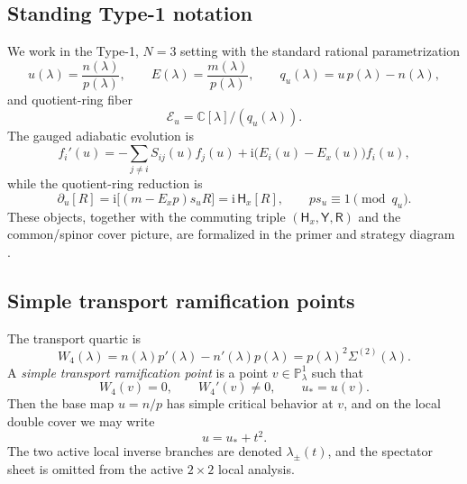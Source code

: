 \documentclass[11pt]{article}
\numberwithin{equation}{section}
\theoremstyle{definition}
\newcommand{\C}{\mathbb C}
\newcommand{\PP}{\mathbb P}
\newcommand{\ii}{\mathrm i}
\newcommand{\E}{\mathcal E}
\newcommand{\Hx}{\mathsf H_x}
\newcommand{\Yop}{\mathsf Y}
\newcommand{\Rop}{\mathsf R}
\begin{document}
\subsection{Standing Type-1 notation}

We work in the Type-1, $N=3$ setting with the standard rational parametrization
\begin{equation}
\label{eq:uE}
 u(\lambda)=\frac{n(\lambda)}{p(\lambda)},
 \qquad
 E(\lambda)=\frac{m(\lambda)}{p(\lambda)},
 \qquad
 q_u(\lambda)=u\,p(\lambda)-n(\lambda),
\end{equation}
and quotient-ring fiber
\begin{equation}
\label{eq:quotient-ring}
 \E_u=\C[\lambda]/(q_u(\lambda)).
\end{equation}
The gauged adiabatic evolution is
\begin{equation}
\label{eq:adiabatic-gauged}
 f_i'(u)=-\sum_{j\neq i}S_{ij}(u)f_j(u)+\ii\bigl(E_i(u)-E_x(u)\bigr)f_i(u),
\end{equation}
while the quotient-ring reduction is
\begin{equation}
\label{eq:reduced-ode}
 \partial_u[R]=\ii\bigl[(m-E_xp)s_u R\bigr]=\ii\,\Hx[R],
 \qquad
 p s_u\equiv 1\pmod{q_u}.
\end{equation}
These objects, together with the commuting triple $(\Hx,\Yop,\Rop)$ and the common/spinor cover picture, are formalized in the primer and strategy diagram \cite{Primer,Strategy,LZSummary}.

\subsection{Simple transport ramification points}

The transport quartic is
\begin{equation}
\label{eq:W4def}
 W_4(\lambda)=n(\lambda)p'(\lambda)-n'(\lambda)p(\lambda)=p(\lambda)^2\Sigma^{(2)}(\lambda).
\end{equation}
A \emph{simple transport ramification point} is a point $v\in\PP^1_\lambda$ such that
\begin{equation}
\label{eq:simple-ramification}
 W_4(v)=0,
 \qquad
 W_4'(v)\neq 0,
 \qquad
 u_*=u(v).
\end{equation}
Then the base map $u=n/p$ has simple critical behavior at $v$, and on the local double cover we may write
\begin{equation}
\label{eq:t-cover}
 u=u_*+t^2.
\end{equation}
The two active local inverse branches are denoted $\lambda_\pm(t)$, and the spectator sheet is omitted from the active $2\times 2$ local analysis.
\end{document}
